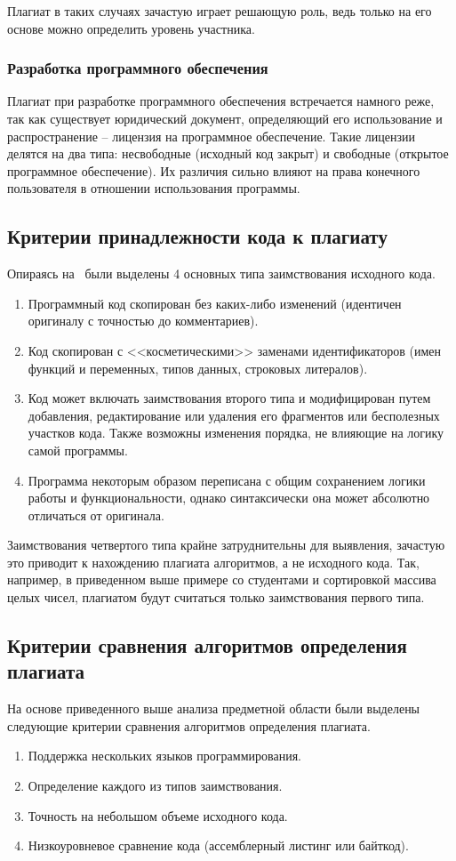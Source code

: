 Плагиат в таких случаях зачастую играет решающую роль, ведь только на его основе можно определить уровень участника.

\subsubsection{Разработка программного обеспечения}
Плагиат при разработке программного обеспечения встречается намного реже, так как существует юридический документ, определяющий  его использование и распространение -- лицензия на программное обеспечение. Такие лицензии делятся на два типа: несвободные (исходный код закрыт) и свободные (открытое программное обеспечение). Их различия сильно влияют на права конечного пользователя в отношении использования программы.

\subsection{Критерии принадлежности кода к плагиату}
Опираясь на~\cite{treb} были выделены 4 основных типа заимствования исходного кода.
 \begin{enumerate}
 	\item Программный код скопирован без каких-либо изменений (идентичен оригиналу с точностью до комментариев).
 	\item Код скопирован с <<косметическими>> заменами идентификаторов (имен функций и переменных, типов данных, строковых литералов).
 	\item Код может включать заимствования второго типа и модифицирован путем добавления, редактирование или удаления его фрагментов или бесполезных участков кода. Также возможны изменения порядка, не влияющие на логику самой программы.
 	\item Программа некоторым образом переписана с общим сохранением логики работы и функциональности, однако синтаксически она может абсолютно отличаться от оригинала.
 \end{enumerate}

Заимствования четвертого типа крайне затруднительны для выявления, зачастую это приводит к нахождению плагиата алгоритмов, а не исходного кода. Так, например, в приведенном выше примере со студентами и сортировкой массива целых чисел, плагиатом будут считаться только заимствования первого типа.

\subsection{Критерии сравнения алгоритмов определения плагиата}
На основе приведенного выше анализа предметной области были выделены следующие критерии сравнения алгоритмов определения плагиата.
\begin{enumerate}
	\item Поддержка нескольких языков программирования.
	\item Определение каждого из типов заимствования.
	\item Точность на небольшом объеме исходного кода. 
	\item Низкоуровневое сравнение кода (ассемблерный листинг или байткод).
\end{enumerate}
\pagebreak